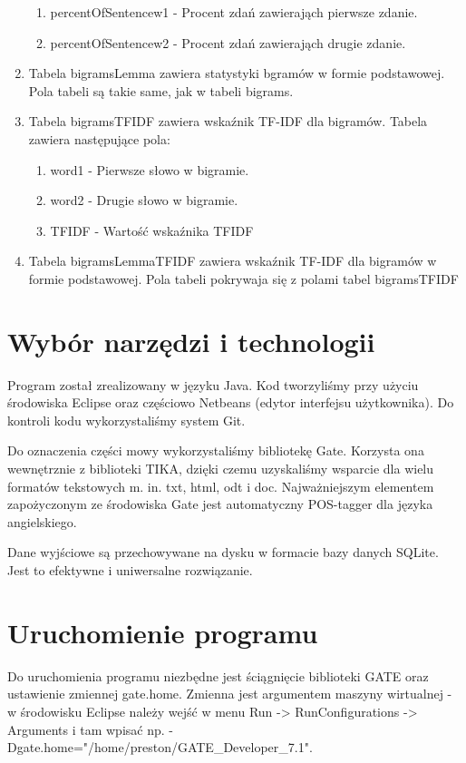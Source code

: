 \documentclass[11pt]{article}
\begin{document}
\begin{enumerate}
\begin{enumerate}
     \item percentOfSentencew1 - Procent zdań zawierająch pierwsze zdanie.
     \item percentOfSentencew2 - Procent zdań zawierająch drugie zdanie.
  \end{enumerate}
  \item Tabela bigramsLemma zawiera statystyki bgramów w formie podstawowej. Pola tabeli są takie same, jak w tabeli bigrams.
  \item Tabela bigramsTFIDF zawiera wskaźnik TF-IDF dla bigramów. Tabela zawiera następujące pola:
  \begin{enumerate}
     \item word1 - Pierwsze słowo w bigramie.
     \item word2 - Drugie słowo w bigramie.
     \item  TFIDF - Wartość wskaźnika TFIDF
  \end{enumerate}
  \item Tabela bigramsLemmaTFIDF zawiera wskaźnik TF-IDF dla bigramów w formie podstawowej.
  Pola tabeli pokrywaja się z polami tabel bigramsTFIDF
\end{enumerate}
\section{Wybór narzędzi i technologii}
Program został zrealizowany w języku Java.
Kod tworzyliśmy przy użyciu środowiska Eclipse oraz częściowo Netbeans (edytor interfejsu użytkownika).
Do kontroli kodu wykorzystaliśmy system Git.

Do oznaczenia części mowy wykorzystaliśmy bibliotekę Gate.
Korzysta ona wewnętrznie z biblioteki TIKA, dzięki czemu uzyskaliśmy wsparcie dla wielu formatów tekstowych m. in. txt, html, odt i doc.
Najważniejszym elementem zapożyczonym ze środowiska Gate jest automatyczny POS-tagger dla języka angielskiego.

Dane wyjściowe są przechowywane na dysku w formacie bazy danych SQLite.
Jest to efektywne i uniwersalne rozwiązanie.

\section{Uruchomienie programu}
Do uruchomienia programu niezbędne jest ściągnięcie biblioteki GATE oraz ustawienie zmiennej gate.home.
Zmienna jest argumentem maszyny wirtualnej - w środowisku Eclipse należy wejść w menu Run -> RunConfigurations -> Arguments i tam wpisać np. -Dgate.home="/home/preston/GATE\_Developer\_7.1".
\end{document}
